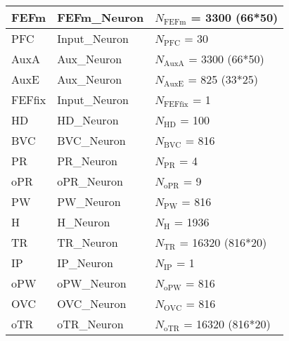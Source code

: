 \documentclass{article}
\begin{document}
\begin{tabularx}{\linewidth}{|l|l|X|}
    FEFm             & FEFm\_Neuron        & $N_{\text{FEFm}}$ = 3300 (66*50)  \\ \hline

    PFC             & Input\_Neuron        & $N_{\text{PFC}}$ = 30  \\ \hline

    AuxA             & Aux\_Neuron        & $N_{\text{AuxA}}$ = 3300 (66*50)  \\ \hline

    AuxE             & Aux\_Neuron        & $N_{\text{AuxE}}$ = 825 (33*25)  \\ \hline

    FEFfix             & Input\_Neuron        & $N_{\text{FEFfix}}$ = 1  \\ \hline

    HD             & HD\_Neuron        & $N_{\text{HD}}$ = 100  \\ \hline

    BVC             & BVC\_Neuron        & $N_{\text{BVC}}$ = 816  \\ \hline

    PR             & PR\_Neuron        & $N_{\text{PR}}$ = 4  \\ \hline

    oPR             & oPR\_Neuron        & $N_{\text{oPR}}$ = 9  \\ \hline

    PW             & PW\_Neuron        & $N_{\text{PW}}$ = 816  \\ \hline

    H             & H\_Neuron        & $N_{\text{H}}$ = 1936  \\ \hline

    TR             & TR\_Neuron        & $N_{\text{TR}}$ = 16320 (816*20)  \\ \hline

    IP             & IP\_Neuron        & $N_{\text{IP}}$ = 1  \\ \hline

    oPW             & oPW\_Neuron        & $N_{\text{oPW}}$ = 816  \\ \hline

    OVC             & OVC\_Neuron        & $N_{\text{OVC}}$ = 816  \\ \hline

    oTR             & oTR\_Neuron        & $N_{\text{oTR}}$ = 16320 (816*20)  \\ \hline

\end{tabularx}
\end{document}
